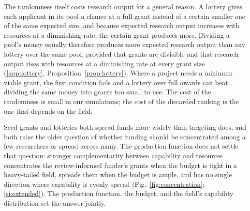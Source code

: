 \documentclass[article, 11pt, reqno]{amsart}
\theoremstyle{named}
\begin{document}
The randomness itself costs research output for a general reason. A lottery gives each applicant in its pool a chance at a full grant instead of a certain smaller one of the same expected size, and because expected research output increases with resources at a diminishing rate, the certain grant produces more. Dividing a pool's money equally therefore produces more expected research output than any lottery over the same pool, provided that grants are divisible and that research output rises with resources at a diminishing rate at every grant size (\ref{app:lottery}, Proposition~\ref{prop:lottery}). Where a project needs a minimum viable grant, the first condition fails and a lottery over full awards can beat dividing the same money into grants too small to use. The cost of the randomness is small in our simulations; the cost of the discarded ranking is the one that depends on the field.

Seed grants and lotteries both spread funds more widely than targeting does, and both raise the older question of whether funding should be concentrated among a few researchers or spread across many. The production function does not settle that question: stronger complementarity between capability and resources concentrates the review-informed funder's grants when the budget is tight in a heavy-tailed field, spreads them when the budget is ample, and has no single direction where capability is evenly spread (Fig.~\ref{fig:concentration}; \ref{si:extended}). The production function, the budget, and the field's capability distribution set the answer jointly.


\end{document}

